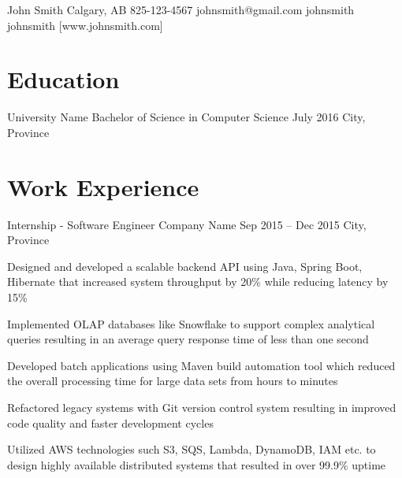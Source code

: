 \documentclass[letterpaper]{resume_config}
\begin{document}
\Header
    {John Smith} %
    {Calgary, AB} %
    {825-123-4567} %
    {johnsmith@gmail.com} %
    {johnsmith} %
    {johnsmith} %
    [www.johnsmith.com] %


\section{Education}

\EducationExperience
    {University Name} %
    {Bachelor of Science in Computer Science} %
    {July 2016} %
    {City, Province} %

\vspace{-14pt}


\section{Work Experience}

\WorkExperience
    {Internship - Software Engineer} %
    {Company Name} %
    {Sep 2015 -- Dec 2015} %
    {City, Province} %
    {
        \item Designed and developed a scalable backend API using Java, Spring Boot, Hibernate that increased system throughput by 20\% while reducing latency by 15\%
        \item Implemented OLAP databases like Snowflake to support complex analytical queries resulting in an average query response time of less than one second
        \item Developed batch applications using Maven build automation tool which reduced the overall processing time for large data sets from hours to minutes
        \item Refactored legacy systems with Git version control system resulting in improved code quality and faster development cycles
        \item Utilized AWS technologies such S3, SQS, Lambda, DynamoDB, IAM etc. to design highly available distributed systems that resulted in over 99.9\% uptime
    }
\end{document}

